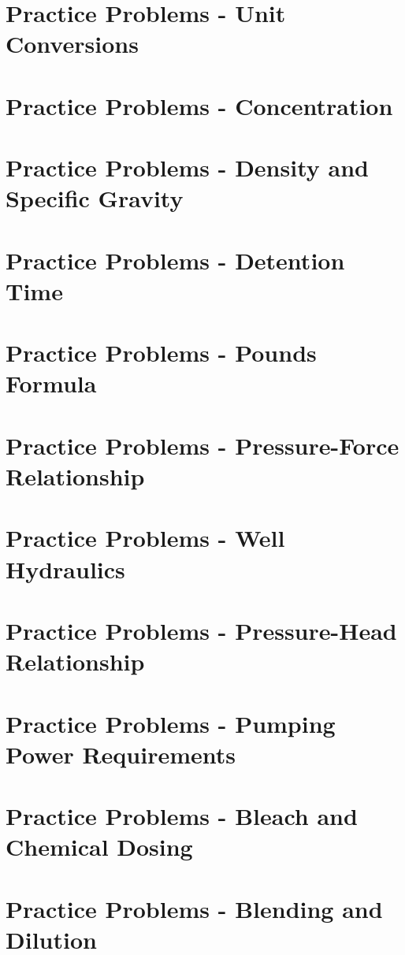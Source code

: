 \section*{Practice Problems - Unit Conversions}

\section*{Practice Problems - Concentration}


\section*{Practice Problems - Density and Specific Gravity}


\section*{Practice Problems - Detention Time}


\section*{Practice Problems - Pounds Formula}


\section*{Practice Problems - Pressure-Force Relationship}


\section*{Practice Problems - Well Hydraulics}


\section*{Practice Problems - Pressure-Head Relationship}


\section*{Practice Problems - Pumping Power Requirements}


\section*{Practice Problems - Bleach and Chemical Dosing}


\section*{Practice Problems - Blending and Dilution}


